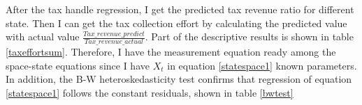 
After the tax handle regression, I get the predicted tax revenue ratio for different state. Then I can get the tax collection effort by calculating the predicted value with actual value $\frac{Tax\_revenue\_predict}{Tax\_revenue\_actual}$. Part of the descriptive results is shown in table \ref{taxeffortsum}. Therefore, I have the measurement equation ready among the space-state equations since I have $X_t$ in equation \ref{statespace1} known parameters. In addition, the B-W heteroskedasticity test confirms that regression of equation \ref{statespace1} follows the constant residuals, shown in table \ref{bwtest}

